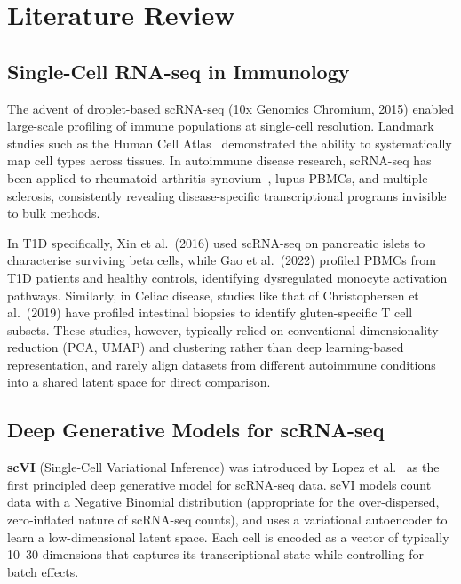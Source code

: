 \chapter{Literature Review}
\label{chap:lit}

\section{Single-Cell RNA-seq in Immunology}

The advent of droplet-based scRNA-seq (10x Genomics Chromium, 2015) enabled large-scale profiling of immune populations at single-cell resolution. Landmark studies such as the Human Cell Atlas~\cite{regev2017human} demonstrated the ability to systematically map cell types across tissues. In autoimmune disease research, scRNA-seq has been applied to rheumatoid arthritis synovium~\cite{zhang2019defining}, lupus PBMCs, and multiple sclerosis, consistently revealing disease-specific transcriptional programs invisible to bulk methods.

In T1D specifically, Xin et al.\ (2016) used scRNA-seq on pancreatic islets to characterise surviving beta cells, while Gao et al.\ (2022) profiled PBMCs from T1D patients and healthy controls, identifying dysregulated monocyte activation pathways. Similarly, in Celiac disease, studies like that of Christophersen et al.\ (2019) have profiled intestinal biopsies to identify gluten-specific T cell subsets. These studies, however, typically relied on conventional dimensionality reduction (PCA, UMAP) and clustering rather than deep learning-based representation, and rarely align datasets from different autoimmune conditions into a shared latent space for direct comparison.

\section{Deep Generative Models for scRNA-seq}

\textbf{scVI} (Single-Cell Variational Inference) was introduced by Lopez et al.~\cite{lopez2018deep} as the first principled deep generative model for scRNA-seq data. scVI models count data with a Negative Binomial distribution (appropriate for the over-dispersed, zero-inflated nature of scRNA-seq counts), and uses a variational autoencoder to learn a low-dimensional latent space. Each cell is encoded as a vector of typically 10--30 dimensions that captures its transcriptional state while controlling for batch effects.

